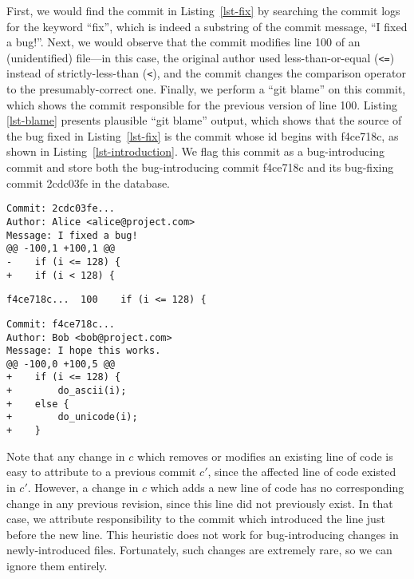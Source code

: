 First, we would find the commit in Listing~\ref{lst-fix} by searching
the commit logs for the keyword ``fix'', which is indeed a substring
of the commit message, ``I fixed a bug!''.  Next, we would observe
that the commit modifies line 100 of an (unidentified) file---in this
case, the original author used less-than-or-equal (\verb+<=+) instead
of strictly-less-than (\verb+<+), and the commit changes the
comparison operator to the presumably-correct one.  Finally, we
perform a ``git blame'' on this commit, which shows the commit
responsible for the previous version of line 100. Listing
\ref{lst-blame} presents plausible ``git blame'' output, which shows
that the source of the bug fixed in Listing~\ref{lst-fix} is the
commit whose id begins with f4ce718c, as shown in
Listing~\ref{lst-introduction}. We flag this commit as a
bug-introducing commit and store both the bug-introducing
commit f4ce718c and its bug-fixing commit 2cdc03fe in the database.

\begin{lstlisting}[caption=An example bug-fix,label=lst-fix,frame=single]
Commit: 2cdc03fe...
Author: Alice <alice@project.com>
Message: I fixed a bug!
@@ -100,1 +100,1 @@
-    if (i <= 128) {
+    if (i < 128) {
    \end{lstlisting}

    \begin{lstlisting}[caption=Blame of the bug-fix,label=lst-blame,frame=single]
f4ce718c...  100    if (i <= 128) {
    \end{lstlisting}

    \begin{lstlisting}[caption=An example bug-introduction,label=lst-introduction, frame=single]
Commit: f4ce718c...
Author: Bob <bob@project.com>
Message: I hope this works.
@@ -100,0 +100,5 @@
+    if (i <= 128) {
+        do_ascii(i);
+    else {
+        do_unicode(i);
+    }
    \end{lstlisting}

Note that any change in $c$ which removes or modifies an existing line
of code is easy to attribute to a previous commit $c'$, since the
affected line of code existed in $c'$. However, a change in $c$ which
adds a new line of code has no corresponding change in any previous
revision, since this line did not previously exist. In that case, we
attribute responsibility to the commit which introduced the line just
before the new line. This heuristic does not work for bug-introducing
changes in newly-introduced files. Fortunately, such changes are
extremely rare, so we can ignore them entirely.

